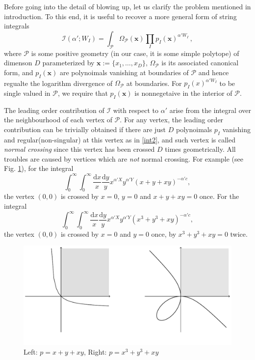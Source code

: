 \documentclass[12pt]{article}
\theoremstyle{definition}
\theoremstyle{plain}
\newcommand{\dif}{\mathrm{d}} %
\begin{document}
Before going into the detail of blowing up, let us clarify the problem mentioned in introduction. To this end, it is useful to recover a more general form of string integrals
\begin{equation*}
  \mathcal{I}(\alpha';W_{I})=\int_{\mathcal{P}} \Omega_{\mathcal{P}}(\mathbf{x}) \prod_{I}p_{I}(\mathbf{x})^{\alpha'W_{I}}\,,
\end{equation*}
where $\mathcal{P}$ is some positive geometry (in our case, it is some simple polytope) of dimenson $D$ parameterized by $\mathbf{x}:= \{x_{1},\ldots,x_{D}\}$, $\Omega_{\mathcal{P}}$ is its associated canonical form, and $p_{I}(\mathbf{x})$ are polynoimals vanishing at boundaries of $\mathcal{P}$ and hence regualte the logarithm divergence of $\Omega_{\mathcal{P}}$ at boundaries. For $p_{I}(x)^{\alpha' W_{I}}$ to be single valued in $\mathcal{P}$, we require that $p_{I}(\mathbf{x})$ is nonnegetaive in the interior of $\mathcal{P}$. %

The leading order contribution of $\mathcal{I}$ with respect to $\alpha'$ arise from the integral over the neighbourhood of each vertex of $\mathcal{P}$. For any vertex, the leading order contribution can be trivially obtained if there are just $D$ polynoimals $p_{I}$ vanishing and regular(non-singular) at this vertex as in \eqref{int2}, and such vertex is called {\it{normal crossing}} since this vertex has been crossed $D$ times geometrically. All troubles are caused by vertices which are {\it not} normal crossing. For example (see Fig. \ref{fig_1}), for the integral 
\[
	\int_0^\infty \int_0^\infty \frac{\dif x}{x}\frac{\dif y}{y}x^{\alpha' X}
	y^{\alpha' Y}(x+y+ xy)^{-\alpha' c},
\] 
the vertex $(0,0)$ is crossed by $x=0$, $y=0$ and $x+y+xy=0$ once. 
For the integral
\[
	\int_0^\infty \int_0^\infty \frac{\dif x}{x}\frac{\dif y}{y}x^{\alpha' X}
	y^{\alpha' Y}(x^3+y^3+ xy)^{-\alpha' c},
\] 
the vertex $(0,0)$ is crossed by $x=0$ and $y=0$ once, by $x^3+y^3+xy=0$ twice. 

\begin{figure}[h]\label{fig_1}
\begin{center}
\includegraphics[scale=0.75]{fig_1.pdf}
\end{center}
\vspace{-5ex}
\caption{Left: $p=x+y+xy$, Right: $p=x^3+y^3+xy$}
\end{figure}
\end{document}
